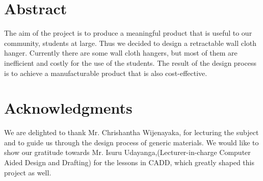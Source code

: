 \documentclass[12pt,a4paper]{article}
\renewcommand{\baselinestretch}{1.5}
\begin{document}

\setcounter{secnumdepth}{0}

\section{Abstract}

The aim of the project is to produce a meaningful product that is useful to our community, students at large. Thus we decided to design a retractable wall cloth hanger. Currently there are some wall cloth hangers, but most of them are inefficient and costly for the use of the students. The result of the design process is to achieve a manufacturable product that is also cost-effective.

\newpage 

\section{Acknowledgments}

We are delighted to thank Mr. Chrishantha Wijenayaka, for lecturing the subject and to guide us through the design process of generic materials. We would like to show our gratitude towards Mr. Isuru Udayanga,(Lecturer-in-charge Computer Aided Design and Drafting) for the lessons in CADD, which greatly shaped this project as well. 




\newpage 
\renewcommand{\baselinestretch}{2}\normalsize
\tableofcontents

\newpage
\listoffigures
 
\listoftables

\listofappendices
\end{document}
